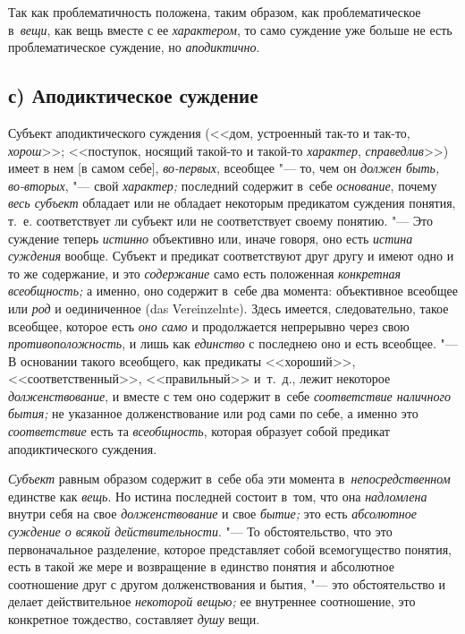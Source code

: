 \label{bkm:bm66b}Так как проблематичность положена, таким образом, как
проблематическое в~{\em вещи}, как вещь вместе с ее {\em характером}, то само
суждение уже больше не есть проблематическое суждение, но {\em аподиктично}.

\subsection[с) Аподиктическое суждение]{с) Аподиктическое суждение}
Субъект аподиктического суждения (<<дом, устроенный так-то и так-то,
{\em хорош}>>; <<поступок, носящий такой-то и такой-то {\em характер},
{\em справедлив}>>) имеет в нем [в самом себе], {\em во-первых},
всеобщее "--- то, чем он {\em должен быть, во-вторых}, "--- свой
{\em характер;} последний содержит в~себе {\em основание}, почему
{\em весь субъект} обладает или не обладает некоторым предикатом суждения
понятия, т.~е. соответствует ли субъект или не соответствует своему
понятию. "--- Это суждение теперь {\em истинно} объективно или, иначе говоря,
оно есть {\em истина суждения} вообще. Субъект и предикат соответствуют друг
другу и имеют одно и то же содержание, и это {\em содержание} само есть
положенная {\em конкретная всеобщность;} а именно, оно содержит в~себе два
момента: объективное всеобщее или {\em род} и
оединиченное (das Verein\-zelnte). Здесь имеется, следовательно, такое
всеобщее, которое есть {\em оно само} и продолжается непрерывно через свою
{\em противоположность}, и лишь как {\em единство} с последнею оно и есть
всеобщее. "--- В основании такого всеобщего, как предикаты <<хороший>>,
<<соответственный>>, <<правильный>> и~т.~д., лежит некоторое
{\em долженствование}, и вместе с тем оно содержит в~себе {\em соответствие
наличного бытия;} не указанное долженствование или род сами по себе, а именно
это {\em соответствие} есть та {\em всеобщность}, которая образует собой
предикат аподиктического суждения.

{\em Субъект} равным образом содержит в~себе оба эти момента
в~{\em непосредственном} единстве как {\em вещь}. Но истина последней состоит
в~том, что она {\em надломлена} внутри себя на свое {\em долженствование}
и свое {\em бытие;} это есть {\em абсолютное суждение о всякой
действительности}. "--- То обстоятельство,
что это первоначальное разделение, которое представляет собой всемогущество
понятия, есть в такой же мере и возвращение в единство понятия и абсолютное
соотношение друг с другом долженствования и бытия, "--- это обстоятельство
и делает действительное {\em некоторой вещью;} ее внутреннее соотношение,
это конкретное тождество, составляет {\em душу} вещи.

